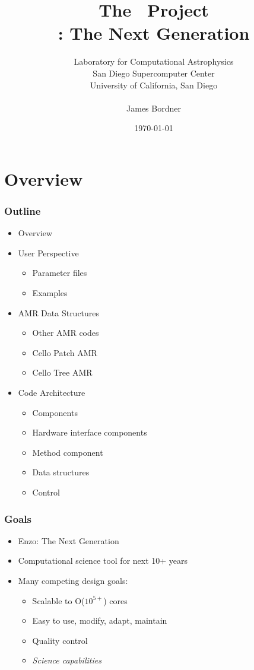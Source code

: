 \documentclass{beamer}
\title[The \cello\ Project]
      {The \cello\ Project \\ \small{\enzo: The Next Generation}}
\author[James Bordner]{\small Laboratory for Computational Astrophysics \\ San Diego Supercomputer Center \\ University of California, San Diego \\ \ \\ James Bordner}
\date{\today}
\newcommand{\enzo}{\textsf{Enzo}}
\begin{document}
\frame{\titlepage}
\frame{\tableofcontents}



\section{Overview}
    \begin{frame}[fragile] \frametitle{Outline}
      \begin{itemize}
        \item Overview
        \item User Perspective
        \begin{itemize}
          \item Parameter files
          \item Examples
        \end{itemize}
        \item AMR Data Structures
        \begin{itemize}
          \item Other AMR codes
          \item Cello Patch AMR
          \item Cello Tree AMR
        \end{itemize}
        \item Code Architecture
        \begin{itemize}
          \item Components
          \item Hardware interface components
          \item Method component
          \item Data structures
          \item Control
        \end{itemize}
      \end{itemize}
\end{frame}

    \begin{frame}[fragile] \frametitle{Goals}
      \begin{itemize}
        \item \enzo: The Next Generation
        \item Computational science tool for next 10+ years
        \item Many competing design goals:
        \begin{itemize}
          \item Scalable to O($10^{5+}$)  cores
          \item Easy to use, modify, adapt, maintain
          \item Quality control
          \item \textit{Science capabilities}
        \end{itemize}
      \end{itemize}
\end{frame}
\end{document}
